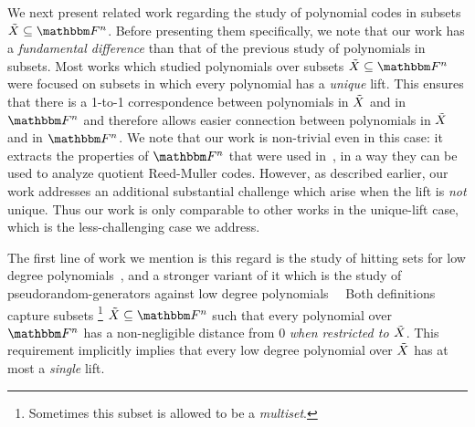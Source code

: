 We next present related work regarding the study of polynomial codes in subsets $\variety \subseteq \field$.
Before presenting them specifically, we note that our work has a \emph{fundamental difference} than that of the previous study of polynomials in subsets.
Most works which studied polynomials over subsets $\variety \subseteq \field$ were focused on subsets in which every polynomial has a \emph{unique} lift.
This ensures that there is a 1-to-1 correspondence between polynomials in ${\tilde{X}}$ and in $\field$
and therefore allows easier connection between polynomials in ${\tilde{X}}$ and in $\field$.
\newline
We note that our work is non-trivial even in this case:
it extracts the properties of $\field$ that were used in~\cite{bhowmick2014list}, in a way they can be used to analyze quotient Reed-Muller codes.
However, as described earlier, our work addresses an additional substantial challenge which arise when the lift is \emph{not} unique.
Thus our work is only comparable to other works in the unique-lift case, which is the less-challenging case we address.

The first line of work we mention is this regard is the study of hitting sets for low degree polynomials~\cite{6243404, 10.1145/2554797.2554828, 6875485},
and a stronger variant of it which is the study of pseudorandom-generators against low degree polynomials~\
    \cite{10.1145/1060590.1060594, 4389478, 10.1145/1374376.1374455, 4558816,  Cohen2013PseudorandomGF, derksen2022fooling, dwivedi2024optimalpseudorandomgeneratorslowdegree}
Both definitions capture subsets
\footnote{Sometimes this subset is allowed to be a \emph{multiset}.}
$\variety \subseteq \field$ such that every polynomial over $\field$ has a non-negligible distance from $0$ \emph{when restricted to ${\tilde{X}}$}.
This requirement implicitly implies that every low degree polynomial over ${\tilde{X}}$ has at most a \emph{single} lift.

